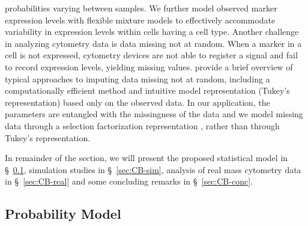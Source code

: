 \documentclass[12pt,]{article}
\begin{document}
probabilities varying between samples.  We further model observed marker
expression levels with flexible mixture models to effectively accommodate
variability in expression levels within cells having a cell type.  Another
challenge in analyzing cytometry data is data missing not at random. When a
marker in a cell is not expressed, cytometry devices are not able to register a
signal and fail to record expression levels, yielding missing values.
\cite{franks2016non} provide a brief overview of typical approaches to imputing
data missing not at random, including a computationally efficient method and
intuitive model representation (Tukey's representation) based only on the
observed data.  In our application, the parameters are entangled with the
missingness of the data and we model missing data through a selection
factorization representation \citep{rubin1974characterizing}, rather than
through Tukey's representation. 


In remainder of the section, we will present the proposed statistical model in
\S~\ref{prob-model}, simulation studies in \S~\ref{sec:CB-sim}, analysis of
real mass cytometry data in \S~\ref{sec:CB-real} and some concluding remarks in
\S~\ref{sec:CB-conc}.










\subsection{Probability Model}\label{prob-model}
\end{document}
